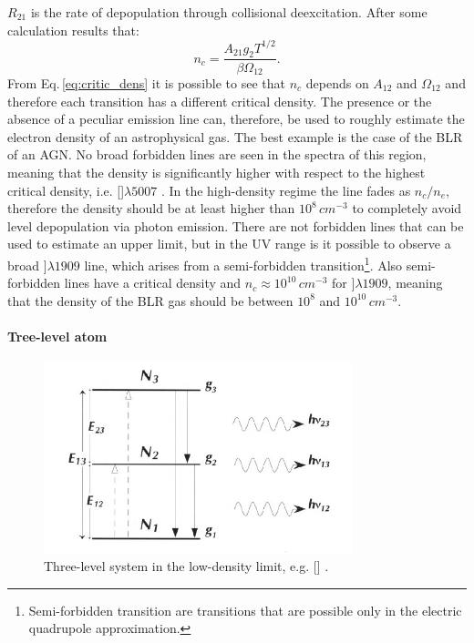 \documentclass[../main.tex]{subfiles}
\begin{document}
$R_{21}$ is the rate of depopulation through collisional deexcitation.
After some calculation results that:
\begin{equation}
    \label{eq:critic_dens}
    n_c = \frac{A_{21}g_2T^{1/2}}{\beta\Omega_{12}}.
\end{equation}
From Eq.\,\ref{eq:critic_dens} it is possible to see that $n_c$ depends on $A_{12}$ and $\Omega_{12}$ and therefore each transition has a different critical density.
The presence or the absence of a peculiar emission line can, therefore, be used to roughly estimate the electron density of an astrophysical gas.
The best example is the case of the BLR of an AGN. 
No broad forbidden lines are seen in the spectra of this region, meaning that the density is significantly higher with respect to the highest critical density, i.e. []$\lambda5007$ \citep[$n_c \approx10^6\,\si{cm^{-3}}$][]{OsterbrockAGN}.
In the high-density regime the line fades as $n_c/n_e$, therefore the density should be at least higher than $10^8\,\si{cm^{-3}}$ to completely avoid level depopulation via photon emission.
There are not forbidden lines that can be used to estimate an upper limit, but in the UV range is it possible to observe a broad ]$\lambda1909$ line, which arises from a semi-forbidden transition\footnote{Semi-forbidden transition are transitions that are possible only in the electric quadrupole approximation.}.
Also semi-forbidden lines have a critical density and $n_c\approx 10^{10}\,\si{cm^{-3}}$ for ]$\lambda1909$, meaning that the density of the BLR gas should be between $10^8$ and $10^{10}\,\si{cm^{-3}}$.

\paragraph{Tree-level atom}

\begin{figure}
\centering
\includegraphics[width=0.8\textwidth]{images/o3_scheme.png} 
\caption[]{Three-level system in the low-density limit, e.g. [] \citep{Dopita03}.  }
\label{fig:o3_scheme}
\end{figure}
\end{document}
